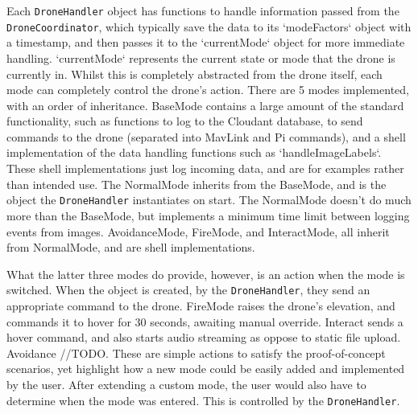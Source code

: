 \documentclass{article}
\begin{document}
Each \texttt{DroneHandler} object has functions to handle information passed from the \texttt{DroneCoordinator}, which typically save the data to its `modeFactors` object with a timestamp, and then passes it to the `currentMode` object for more immediate handling. `currentMode` represents the current state or mode that the drone is currently in. Whilst this is completely abstracted from the drone itself, each mode can completely control the drone's action. There are 5 modes implemented, with an order of inheritance. BaseMode contains a large amount of the standard functionality, such as functions to log to the Cloudant database, to send commands to the drone (separated into MavLink and Pi commands), and a shell implementation of the data handling functions such as `handleImageLabels`. These shell implementations just log incoming data, and are for examples rather than intended use. The NormalMode inherits from the BaseMode, and is the object the \texttt{DroneHandler} instantiates on start. The NormalMode doesn't do much more than the BaseMode, but implements a minimum time limit between logging events from images. AvoidanceMode, FireMode, and InteractMode, all inherit from NormalMode, and are shell implementations. 

What the latter three modes do provide, however, is an action when the mode is switched. When the object is created, by the \texttt{DroneHandler}, they send an appropriate command to the drone. FireMode raises the drone's elevation, and commands it to hover for 30 seconds, awaiting manual override. Interact sends a hover command, and also starts audio streaming as oppose to static file upload. Avoidance //TODO. These are simple actions to satisfy the proof-of-concept scenarios, yet highlight how a new mode could be easily added and implemented by the user. After extending a custom mode, the user would also have to determine when the mode was entered. This is controlled by the \texttt{DroneHandler}.
\end{document}
